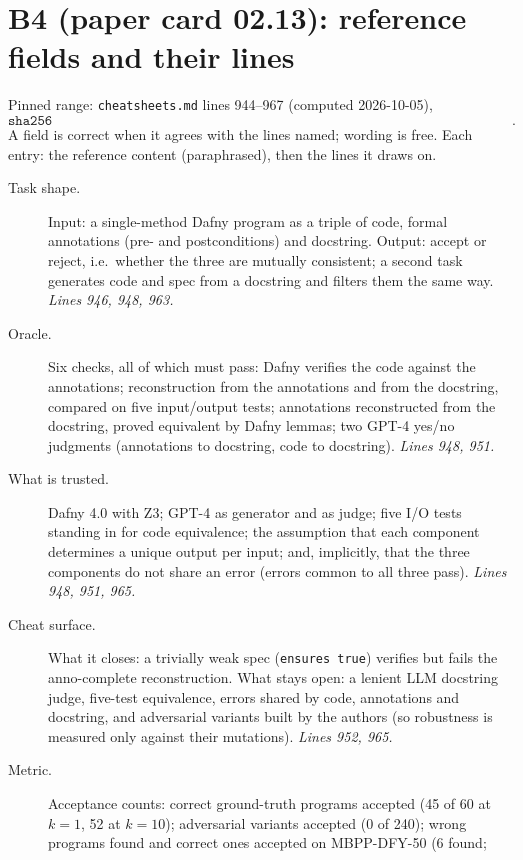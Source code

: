 \documentclass[11pt]{article}
\begin{document}
\section*{B4 (paper card 02.13): reference fields and their lines}

Pinned range: \texttt{cheatsheets.md} lines 944--967 (computed 2026-10-05),
\[ \texttt{sha256 d323712a0a7d430510ca9b9f14daa83c0c6ca9ad876eaffa542ed9c6bc56a38e}. \] A field is correct when it agrees with the lines named;
wording is free. Each entry: the reference content (paraphrased), then the
lines it draws on.

\begin{description}
\item[Task shape.] Input: a single-method Dafny program as a triple of code,
  formal annotations (pre- and postconditions) and docstring. Output: accept
  or reject, i.e.\ whether the three are mutually consistent; a second task
  generates code and spec from a docstring and filters them the same way.
  \emph{Lines 946, 948, 963.}
\item[Oracle.] Six checks, all of which must pass: Dafny verifies the code
  against the annotations; reconstruction from the annotations and from the
  docstring, compared on five input/output tests; annotations reconstructed
  from the docstring, proved equivalent by Dafny lemmas; two GPT-4 yes/no
  judgments (annotations to docstring, code to docstring).
  \emph{Lines 948, 951.}
\item[What is trusted.] Dafny 4.0 with Z3; GPT-4 as generator and as judge;
  five I/O tests standing in for code equivalence; the assumption that each
  component determines a unique output per input; and, implicitly, that the
  three components do not share an error (errors common to all three pass).
  \emph{Lines 948, 951, 965.}
\item[Cheat surface.] What it closes: a trivially weak spec (\texttt{ensures true})
  verifies but fails the anno-complete reconstruction. What stays open: a
  lenient LLM docstring judge, five-test equivalence, errors shared by code,
  annotations and docstring, and adversarial variants built by the authors
  (so robustness is measured only against their mutations).
  \emph{Lines 952, 965.}
\item[Metric.] Acceptance counts: correct ground-truth programs accepted
  (45 of 60 at $k = 1$, 52 at $k = 10$); adversarial variants accepted (0 of
  240); wrong programs found and correct ones accepted on MBPP-DFY-50 (6 found;

\end{description}
\end{document}
